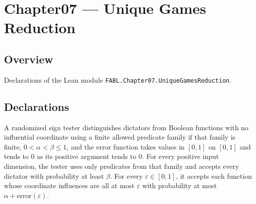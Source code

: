 \chapter{Chapter07 — Unique Games Reduction}
\section{Overview}

Declarations of the Lean module \texttt{FABL.Chapter07.UniqueGamesReduction}.

\section{Declarations}

\begin{definition}
\label{FABL.IsDictatorVsNoInfluentialsTest}
\leanok
{}
A randomized sign tester distinguishes dictators from Boolean functions with no
influential coordinate using a finite allowed predicate family if that family is finite,
$0<\alpha<\beta\le 1$, and the error function takes values in $[0,1]$ on $[0,1]$ and
tends to $0$ as its positive argument tends to $0$. For every positive input dimension,
the tester uses only predicates from that family and accepts every dictator with
probability at least $\beta$. For every $\varepsilon\in[0,1]$, it accepts each function
whose coordinate influences are all at most $\varepsilon$ with probability at most
$\alpha+\mathrm{error}(\varepsilon)$.
\end{definition}

